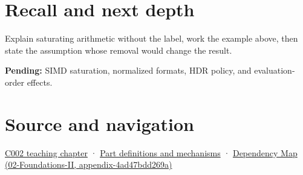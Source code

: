 \section{Recall and next depth}\label{appendix-3999c6209649-recall-and-next-depth}

Explain saturating arithmetic without the label, work the example above, then state the assumption whose removal would change the result.

\textbf{Pending:} SIMD saturation, normalized formats, HDR policy, and evaluation-order effects.

\section{Source and navigation}\label{appendix-3999c6209649-source-and-navigation}

\href{Continuous\%20Notes/Computing\%20Foundations\%20-\%20From\%20Bits\%20to\%20C++\%20and\%20Systems\%20APIs\#Arithmetic\%20becomes\%20a\%20policy}{C002 teaching chapter} · \hyperref[appendix-fd090d982a15]{Part definitions and mechanisms} · \href{../02-Foundations-II/main.pdf\#nameddest=appendix-4ad47bdd269a}{Dependency Map (02-Foundations-II, appendix-4ad47bdd269a)}
